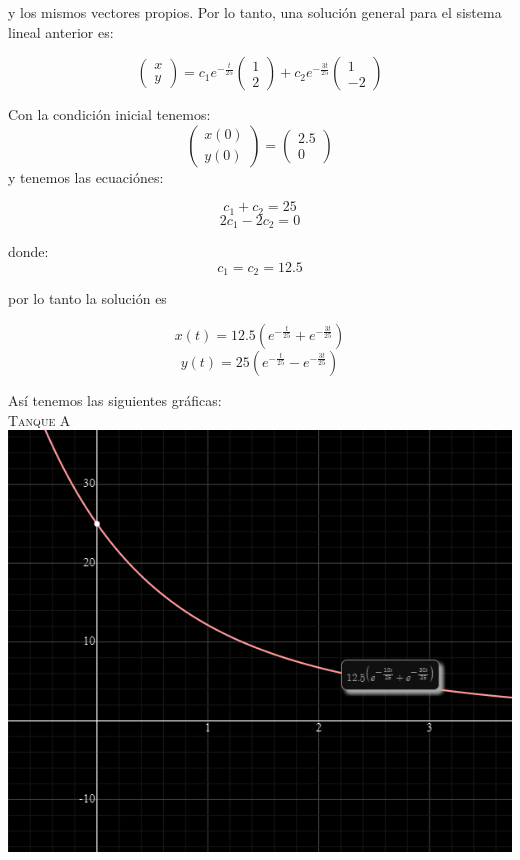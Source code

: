 y los mismos vectores propios. Por lo tanto, una solución general para el sistema lineal anterior es:

$$\begin{pmatrix}x\\ y\end{pmatrix}=c_1e^{-\frac{t}{25}}\begin{pmatrix}1\\ 2\end{pmatrix}+c_2e^{-\frac{3t}{25}}\begin{pmatrix}1\\ -2\end{pmatrix}$$

Con la condici\'on inicial tenemos:
$$\begin{pmatrix}x\left(0\right)\\ y\left(0\right)\end{pmatrix}=\begin{pmatrix}2.5\\ 0\end{pmatrix}$$
y tenemos las ecuaci\'ones:

$$c_1+c_2=25$$
$$2c_1-2c_2=0$$

donde: $$c_1=c_2=12.5$$

por lo tanto la soluci\'on es

$$x(t)=12.5(e^{-\frac{t}{25}}+e^{-\frac{3t}{25}})$$
$$y(t)=25(e^{-\frac{t}{25}}-e^{-\frac{3t}{25}})$$

As\'i tenemos las siguientes gr\'aficas:\\

\textsc{Tanque A}\\
\includegraphics[scale=0.5]{Imagenes/Ejercicio7a.png}\\

